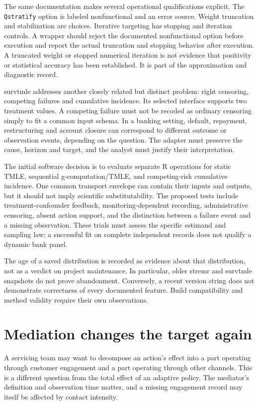 The same documentation makes several operational qualifications explicit.
The \texttt{Qstratify} option is labeled nonfunctional and an error source.
Weight truncation and stabilization are choices. Iterative targeting has
stopping and iteration controls. A wrapper should reject the documented
nonfunctional option before execution and report the actual truncation and
stopping behavior after execution. A truncated weight or stopped numerical
iteration is not evidence that positivity or statistical accuracy has been
established. It is part of the approximation and diagnostic record.

survtmle addresses another closely related but distinct problem: right
censoring, competing failures and cumulative incidence. Its selected interface
supports two treatment values. A competing failure must not be recoded as
ordinary censoring simply to fit a common input schema. In a banking setting,
default, repayment, restructuring and account closure can correspond to
different outcome or observation events, depending on the question. The
adapter must preserve the cause, horizon and target, and the analyst must
justify their interpretation.\cite{survtmle}

The initial software decision is to evaluate separate R operations for static
TMLE, sequential g-computation/TMLE, and competing-risk cumulative incidence.
One common transport envelope can contain their inputs and outputs, but it
should not imply scientific substitutability. The proposed tests include
treatment-confounder feedback, monitoring-dependent recording, administrative
censoring, absent action support, and the distinction between a failure event
and a missing observation. These trials must assess the specific estimand and
sampling law; a successful fit on complete independent records does not
qualify a dynamic bank panel.

The age of a saved distribution is recorded as evidence about that distribution,
not as a verdict on project maintenance. In particular, older stremr and
survtmle snapshots do not prove abandonment. Conversely, a recent version
string does not demonstrate correctness of every documented feature. Build
compatibility and method validity require their own observations.

\section{Mediation changes the target again}

A servicing team may want to decompose an action's effect into a part operating
through customer engagement and a part operating through other channels. This
is a different question from the total effect of an adaptive policy. The
mediator's definition and observation time matter, and a missing engagement
record may itself be affected by contact intensity.

